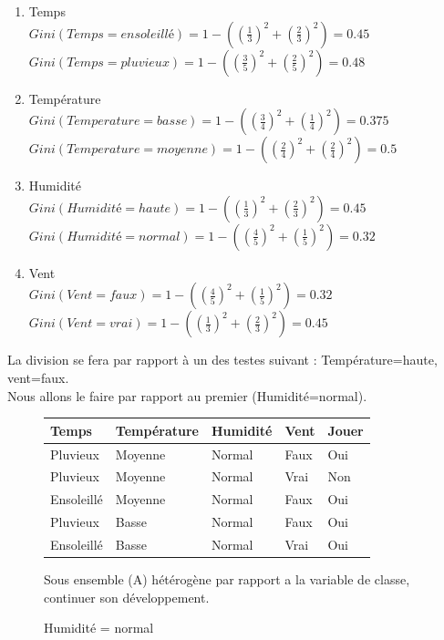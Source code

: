 \documentclass[a4paper, 11pt]{report}
\begin{document}
\begin{enumerate}
\item Temps\\
$Gini(Temps = ensoleillé) = 1 - ((\frac{1}{3})^2 + (\frac{2}{3})^2)=0.45 $\\
$Gini(Temps = pluvieux) = 1 - ((\frac{3}{5})^2 + (\frac{2}{5})^2)=0.48 $\\
\item Température\\
$Gini(Temperature = basse) = 1 - ((\frac{3}{4})^2 + (\frac{1}{4})^2)=0.375 $\\
$Gini(Temperature = moyenne) = 1 - ((\frac{2}{4})^2 + (\frac{2}{4})^2)=0.5 $\\

\item Humidité\\
$Gini(Humidité = haute) = 1 - ((\frac{1}{3})^2 + (\frac{2}{3})^2)=0.45 $\\
$Gini(Humidité = normal) = 1 - ((\frac{4}{5})^2 + (\frac{1}{5})^2)=0.32 $\\

\item Vent\\
$Gini(Vent = faux) = 1 - ((\frac{4}{5})^2 + (\frac{1}{5})^2)=0.32 $\\
$Gini(Vent = vrai) = 1 - ((\frac{1}{3})^2 + (\frac{2}{3})^2)=0.45 $
\end{enumerate}

La division se fera par rapport à un des testes suivant :  Température=haute, vent=faux. \\Nous allons le faire par rapport au premier (Humidité=normal).
\begin{figure}[!h]
\caption{Humidité = normal}
\label{ens5}
\begin{center}
\begin{tabular}{| l | l | l | l | l |}
\hline
\rowcolor{gray!25}
Temps & Température & Humidité & Vent & Jouer \\
\hline
Pluvieux & Moyenne & Normal & Faux & \cellcolor{yellow}Oui \\
\hline
Pluvieux & Moyenne & Normal & Vrai &  \cellcolor{green}Non \\
\hline
Ensoleillé & Moyenne & Normal & Faux &  \cellcolor{yellow}Oui \\
\hline
Pluvieux & Basse & Normal & Faux &  \cellcolor{yellow}Oui \\
\hline
Ensoleillé & Basse & Normal & Vrai &  \cellcolor{yellow}Oui \\
\hline
\end{tabular}
\end{center}
Sous ensemble (A) hétérogène par rapport a la variable de classe, continuer son développement.
\end{figure}
\end{document}
